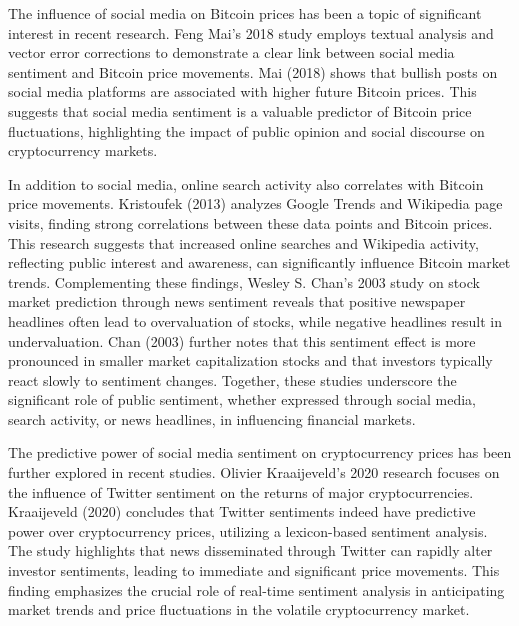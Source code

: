 The influence of social media on Bitcoin prices has been a topic of significant interest in recent research. Feng Mai's 2018 study employs textual analysis and vector error corrections to demonstrate a clear link between social media sentiment and Bitcoin price movements. Mai (2018) shows that bullish posts on social media platforms are associated with higher future Bitcoin prices. This suggests that social media sentiment is a valuable predictor of Bitcoin price fluctuations, highlighting the impact of public opinion and social discourse on cryptocurrency markets.

In addition to social media, online search activity also correlates with Bitcoin price movements. Kristoufek (2013) analyzes Google Trends and Wikipedia page visits, finding strong correlations between these data points and Bitcoin prices. This research suggests that increased online searches and Wikipedia activity, reflecting public interest and awareness, can significantly influence Bitcoin market trends. Complementing these findings, Wesley S. Chan's 2003 study on stock market prediction through news sentiment reveals that positive newspaper headlines often lead to overvaluation of stocks, while negative headlines result in undervaluation. Chan (2003) further notes that this sentiment effect is more pronounced in smaller market capitalization stocks and that investors typically react slowly to sentiment changes. Together, these studies underscore the significant role of public sentiment, whether expressed through social media, search activity, or news headlines, in influencing financial markets.

The predictive power of social media sentiment on cryptocurrency prices has been further explored in recent studies. Olivier Kraaijeveld's 2020 research focuses on the influence of Twitter sentiment on the returns of major cryptocurrencies. Kraaijeveld (2020) concludes that Twitter sentiments indeed have predictive power over cryptocurrency prices, utilizing a lexicon-based sentiment analysis. The study highlights that news disseminated through Twitter can rapidly alter investor sentiments, leading to immediate and significant price movements. This finding emphasizes the crucial role of real-time sentiment analysis in anticipating market trends and price fluctuations in the volatile cryptocurrency market.

